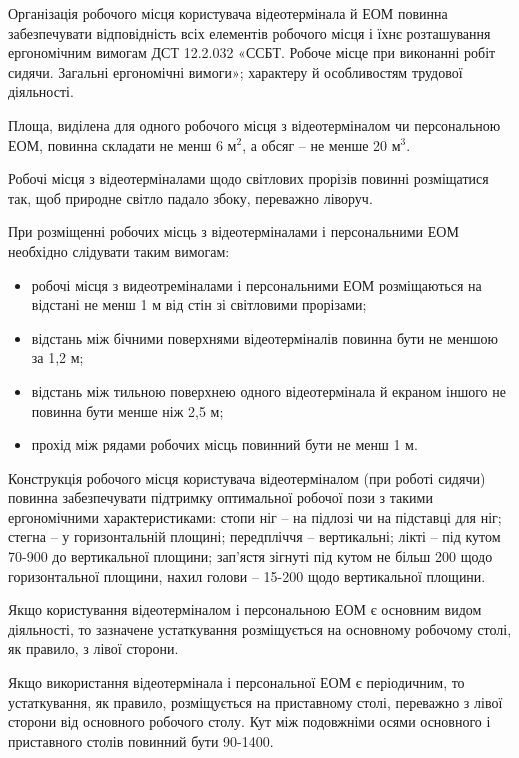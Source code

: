 \documentclass[simple,a4paper,14pt,ukrainian,utf8]{eskdtext}
\begin{document}
\begin{appendices}
                Організація робочого місця користувача відеотермінала й ЕОМ повинна забезпечувати відповідність всіх елементів робочого місця і їхнє розташування ергономічним вимогам ДСТ 12.2.032 «ССБТ. Робоче місце при виконанні робіт сидячи. Загальні ергономічні вимоги»; характеру й особливостям трудової діяльності.

                Площа, виділена для одного робочого місця з відеотерміналом чи персональною ЕОМ, повинна складати не менш 6 м$^{2}$, а обсяг -- не менше 20 м$^{3}$.

                Робочі місця з відеотерміналами щодо світлових прорізів повинні розміщатися так, щоб природне світло падало збоку, переважно ліворуч.

                При розміщенні робочих місць з відеотерміналами і персональними ЕОМ необхідно слідувати таким вимогам:

                \begin{itemize}
                    \item робочі місця з видеотреміналами і персональними ЕОМ розміщаються на відстані не менш 1 м від стін зі світловими прорізами;
                    \item відстань між бічними поверхнями відеотерміналів повинна бути не меншою за 1,2 м;
                    \item відстань між тильною поверхнею одного відеотермінала й екраном іншого не повинна бути менше ніж 2,5 м;
                    \item прохід між рядами робочих місць повинний бути не менш 1 м.
                \end{itemize}

                Конструкція робочого місця користувача відеотерміналом (при роботі сидячи) повинна забезпечувати підтримку оптимальної робочої пози з такими ергономічними характеристиками: стопи ніг -- на підлозі чи на підставці для ніг; стегна -- у горизонтальній площині; передпліччя -- вертикальні; лікті -- під кутом 70-900 до вертикальної площини; зап'ястя зігнуті під кутом не більш 200 щодо горизонтальної площини, нахил голови -- 15-200 щодо вертикальної площини.

                Якщо користування відеотерміналом і персональною ЕОМ є основним видом діяльності, то зазначене устаткування розміщується на основному робочому столі, як правило, з лівої сторони.

                Якщо використання відеотермінала і персональної ЕОМ є періодичним, то устаткування, як правило, розміщується на приставному столі, переважно з лівої сторони від основного робочого столу. Кут між подовжніми осями основного і приставного столів повинний бути 90-1400.


\end{appendices}
\end{document}

